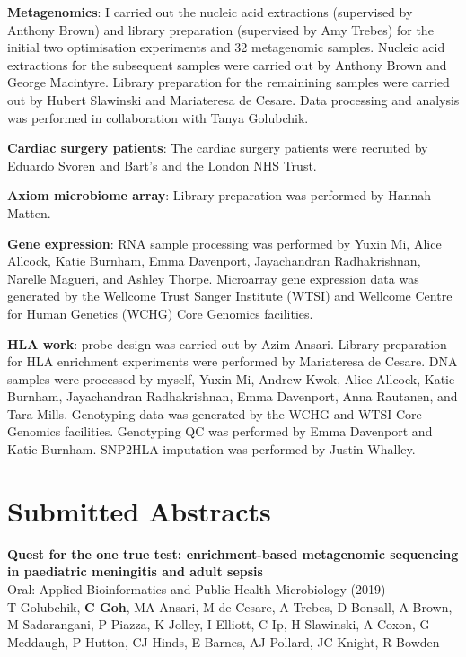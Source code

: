 \textbf{Metagenomics}: I carried out the nucleic acid extractions (supervised by Anthony Brown) and library preparation (supervised by Amy Trebes) for the initial two optimisation experiments and 32 metagenomic samples. Nucleic acid extractions for the subsequent samples were carried out by Anthony Brown and George Macintyre. Library preparation for the remainining samples were carried out by Hubert Slawinski and Mariateresa de Cesare. Data processing and analysis was performed in collaboration with Tanya Golubchik.

\textbf{Cardiac surgery patients}: The cardiac surgery patients were recruited by Eduardo Svoren and Bart's and the London NHS Trust.

\textbf{Axiom microbiome array}: Library preparation was performed by Hannah Matten.

\textbf{Gene expression}: RNA sample processing was performed by Yuxin Mi, Alice Allcock, Katie Burnham, Emma Davenport, Jayachandran Radhakrishnan, Narelle Magueri, and Ashley Thorpe. Microarray gene expression data was generated by the Wellcome Trust Sanger Institute (WTSI) and Wellcome Centre for Human Genetics (WCHG) Core Genomics facilities.

\textbf{HLA work}: probe design was carried out by Azim Ansari. Library preparation for HLA enrichment experiments were performed by Mariateresa de Cesare. DNA samples were processed by myself, Yuxin Mi, Andrew Kwok, Alice Allcock, Katie Burnham, Jayachandran Radhakrishnan, Emma Davenport, Anna Rautanen, and Tara Mills. Genotyping data was generated by the WCHG and WTSI Core Genomics facilities. Genotyping QC was performed by Emma Davenport and Katie Burnham. SNP2HLA imputation was performed by Justin Whalley.

\newpage

\chapter*{Submitted Abstracts}
\thispagestyle{plain} %

\noindent
\textbf{Quest for the one true test: enrichment-based metagenomic sequencing in paediatric meningitis and adult sepsis}\\
Oral: Applied Bioinformatics and Public Health Microbiology (2019)\\
T Golubchik, \textbf{C Goh}, MA Ansari, M de Cesare, A Trebes, D Bonsall, A Brown, M Sadarangani, P Piazza, K Jolley, I Elliott, C Ip, H Slawinski, A Coxon, G Meddaugh, P Hutton, CJ Hinds, E Barnes, AJ Pollard, JC Knight, R Bowden\\

